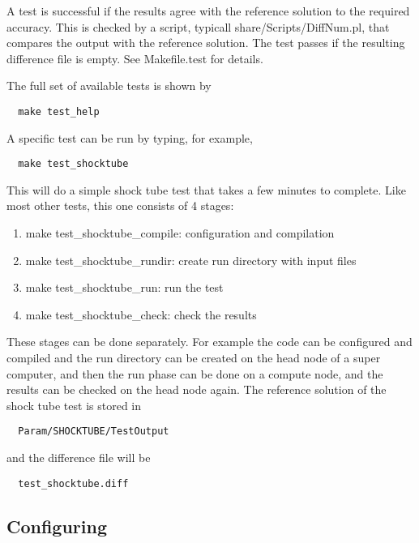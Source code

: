 A test is successful if the results agree with the reference solution
to the required accuracy. This is checked by a script, typicall
share/Scripts/DiffNum.pl, that compares the output with the reference
solution.  The test passes if the resulting difference file is empty.
See Makefile.test for details.

The full set of available tests is shown by 
\begin{verbatim}
  make test_help
\end{verbatim}
A specific test can be run by typing, for example,
\begin{verbatim}
  make test_shocktube
\end{verbatim}
This will do a simple shock tube test that takes a few minutes to complete. 
Like most other tests, this one consists of 4 stages:
\begin{enumerate}
\item make test\_shocktube\_compile: configuration and compilation
\item make test\_shocktube\_rundir:  create run directory with input files
\item make test\_shocktube\_run:     run the test
\item make test\_shocktube\_check:   check the results
\end{enumerate}
These stages can be done separately. For example the code can be configured 
and compiled and the run directory can be created on the head node of 
a super computer, and then the run phase can be done on a compute node, 
and the results can be checked on the head node again.
The reference solution of the shock tube test is stored in 
\begin{verbatim}
  Param/SHOCKTUBE/TestOutput
\end{verbatim}
and the difference file will be
\begin{verbatim}
  test_shocktube.diff
\end{verbatim}


\subsection{Configuring \BATSRUS}

